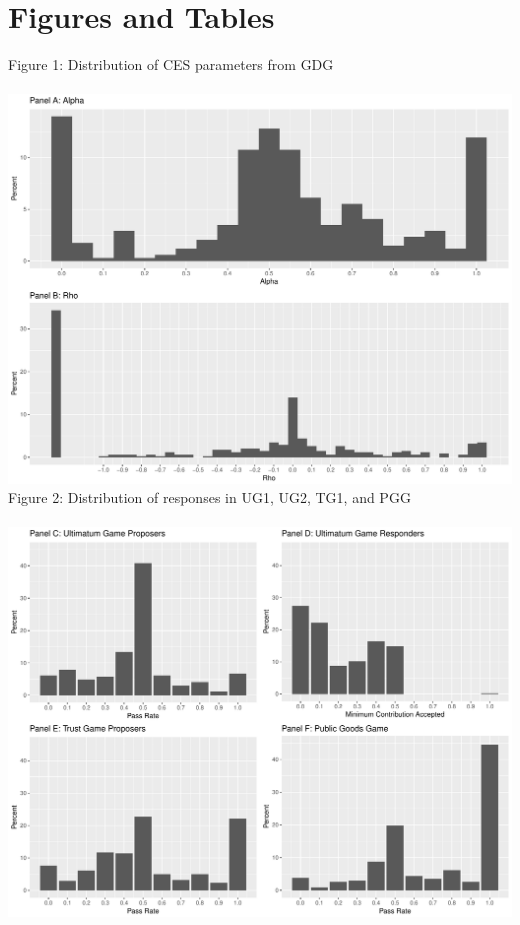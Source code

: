 \documentclass[12pt]{article}
\begin{document}
\section{Figures and Tables} \label{app:d}

\noindent Figure 1: Distribution of CES parameters from GDG \\ \\
\includegraphics[scale=0.4]{Figure2a.pdf} \\



\noindent Figure 2: Distribution of responses in UG1, UG2, TG1, and PGG \\ \\
\includegraphics[scale=0.4]{Figure2b.pdf} \\
\end{document}
